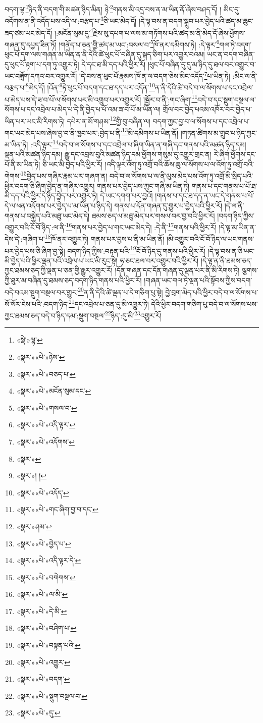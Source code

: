 བདག་ལྟ་\footnote{«སྡེ་»ལྷ་}ཉིད་ནི་བདག་གི་མཚན་ཉིད་མིན། ཉེ་\footnote{«སྣར་»«པེ་»ཉེས་}གནས་མི་འདྲ་བས་ན་མ་ཡིན་ནོ་ཞེས་བཤད་དོ། །
མིང་དུ་འདོགས་ན་ནི་འདོད་པས་འདི་ལ་:བརྩད་པ་\footnote{«སྣར་»«པེ་»བཅད་པ་}ཅི་ཡང་མེད་དོ། །དེ་ལྟ་བས་ན་བདག་སྒྲུབ་པར་བྱེད་པའི་ཚད་མ་ཆུང་ཟད་ཙམ་ཡང་མེད་དོ། །:མངོན་སུམ་དུ་\footnote{«སྣར་»«པེ་»མངོན་སུམ་དང་}རྗེས་སུ་དཔག་པ་ལས་མ་གཏོགས་པའི་ཚད་མ་ནི་མེད་དོ་ཞེས་ཕྱོགས་གཞན་དུ་དཔྱད་ཟིན་ཏོ། །གནོད་པ་ཅན་གྱི་ཚད་མ་ཡང་:བསལ་བ་\footnote{«སྣར་»«པེ་»གསལ་བ་}ཁོ་ནར་དམིགས་ཏེ། :དེ་ལྟར་\footnote{«སྣར་»«པེ་»འདི་ལྟར་}གལ་ཏེ་བདག་ཕུང་པོ་དག་ལས་གཞན་མ་ཡིན་ན་ནི་དེའི་ཚེ་ཕུང་པོ་བཞིན་དུ་སྐད་ཅིག་པར་འགྱུར་བའམ། ཡང་ན་བདག་བཞིན་དུ་ཕུང་པོ་རྟག་པ་དག་ཏུ་འགྱུར་ཏེ། དེ་དང་ཐ་མི་དད་པའི་ཕྱིར་རོ། །ཕུང་པོ་བཞིན་དུ་དུ་མ་ཉིད་དུ་ཐལ་བར་འགྱུར་བ་ཡང་བཟློག་དཀའ་བར་འགྱུར་རོ། །དེ་བས་ན་ཕུང་པོ་རྣམས་ཁོ་ན་ལ་བདག་ཅེས་མིང་འདོད་\footnote{«སྣར་»«པེ་»འདོགས་}པ་ཡིན་ཏེ། :མིང་ལ་ནི་བརྩད་པ་\footnote{«སྣར་»}མེད་དོ། །འོན་\footnote{«སྣར་»། །}ཏེ་ཕུང་པོ་བདག་དང་ཐ་དད་པར་འདོན་\footnote{«སྣར་»«པེ་»འདོད་}ན་ནི་དེའི་ཚེ་བདེ་བ་ལ་སོགས་པ་དང་འབྲེལ་པ་མེད་པས་དེ་ཟ་བ་པོ་ལ་སོགས་པར་མི་འགྲུབ་པར་འགྱུར་རོ། །སྦྱོར་བ་ནི་:གང་ཞིག་\footnote{«སྣར་»«པེ་»གང་ཞིག་བྱ་བ་དང་}བདེ་བ་དང་སྡུག་བསྔལ་ལ་སོགས་པ་དང་འབྲེལ་པ་མེད་པ་དེ་ནི་བྱེད་པ་པོ་འམ་ཟ་བ་པོ་མ་ཡིན་ལ། གྲོལ་བར་བྱེད་པའམ་འཁོར་བར་བྱེད་པ་ཡིན་པར་ཡང་མི་རིགས་ཏེ། དཔེར་ན་མོ་གཤམ་\footnote{«སྣར་»ཤམ་}གྱི་བུ་བཞིན་ལ། བདག་ཀྱང་བྱ་བ་ལ་སོགས་པ་དང་འབྲེལ་པ་གང་ཡང་མེད་པས་ཞེས་བྱ་བ་ནི་ཁྱབ་པར་:བྱེད་པ་ནི་\footnote{«སྣར་»«པེ་»བྱེད་པ་}མི་དམིགས་པ་ཡིན་ནོ། །གཏན་ཚིགས་མ་གྲུབ་པ་ཉིད་ཀྱང་མ་ཡིན་ཏེ། :འདི་ལྟར་\footnote{«སྣར་»«པེ་»འདི་ལྟར་དེ་}བདེ་བ་ལ་སོགས་པ་དང་འབྲེལ་པ་ཞིག་ཡིན་ན་གཞི་དང་གནས་པའི་མཚན་ཉིད་དམ། ལྡན་པའི་མཚན་ཉིད་དམ། རྒྱུ་དང་འབྲས་བུའི་མཚན་ཉིད་དམ་ཕྱོགས་གསུམ་དུ་འགྱུར་གྲང་ན། རེ་ཞིག་ཕྱོགས་དང་པོ་ནི་མ་ཡིན་ཏེ། ཅི་ཡང་མི་བྱེད་པའི་ཕྱིར་རོ། །འདི་ལྟར་འོག་ཏུ་འགྲོ་བའི་ཆོས་ཆུ་ལ་སོགས་པ་ལ་འོག་ཏུ་འགྲོ་བའི་གེགས་\footnote{«སྣར་»«པེ་»བགེགས་}བྱེད་པས་གཞིར་རྣམ་པར་གཞག་ན། བདེ་བ་ལ་སོགས་པ་ལ་ནི་ལུས་མེད་པས་འོག་ཏུ་འགྲོ་མི་སྲིད་པའི་ཕྱིར་བདག་ཅི་ཞིག་བྱེད་ན་གཞིར་འགྱུར། གནས་པར་བྱེད་པས་ཀྱང་གཞི་མ་ཡིན་ཏེ། གནས་པ་དང་གནས་པ་པོ་ཐ་མི་དད་པའི་ཕྱིར་དེ་ཉིད་བྱེད་པར་འགྱུར་ཏེ། དེ་ཡང་དགག་པར་བྱའོ། །གནས་པ་དང་ཐ་དད་ན་ཡང་དེ་གནས་པ་པོ་དེ་ལ་ཕན་འདོགས་པར་བྱེད་པ་མ་ཡིན་པ་ཉིད་དེ། གནས་པ་དོན་གཞན་དུ་གྱུར་པ་བྱེད་པའི་ཕྱིར་རོ། །དེ་ལ་ནི་གནས་པ་བསྐྱེད་པའི་མཐུ་ཡང་མེད་དེ། ཐམས་ཅད་ལ་མཐུ་མེད་པར་གསལ་བར་བྱ་བའི་ཕྱིར་རོ། །བདག་ཉིད་ཀྱིས་འགྱུར་བའི་ངོ་བོ་ཉིད་:ལ་ནི་\footnote{«སྣར་»«པེ་»ལ་མི་}གནས་པར་བྱེད་པ་གང་ཡང་མེད་དེ། :དེ་ནི་\footnote{«སྣར་»«པེ་»དེ་མི་}གནས་པའི་ཕྱིར་རོ། །དེ་ལྟ་མ་ཡིན་ན་དེས་དེ་:གཞིག་པ་\footnote{«སྣར་»«པེ་»བཤིག་པ་}ཁོ་ནར་འགྱུར་ཏེ། གནས་པར་བྱས་པ་ནི་མ་ཡིན་ནོ། །མི་འགྱུར་བའི་ངོ་བོ་ཉིད་ལ་ཡང་གནས་པར་བྱེད་པས་ཅི་ཞིག་བྱ་སྟེ། བདག་ཉིད་ཀྱིས་:བརྟན་པའི་\footnote{«སྣར་»«པེ་»བསྟན་པའི་}ངོ་བོ་ཉིད་དུ་གནས་པའི་ཕྱིར་རོ། །དེ་ལྟ་བས་ན་ཅི་ཡང་མི་བྱེད་པའི་ཕྱིར་ལྡན་པའི་འབྲེལ་པ་ཡང་མི་རུང་སྟེ། ཧ་ཅང་ཐལ་བར་འགྱུར་བའི་ཕྱིར་རོ། །དེ་ལྟ་ན་ནི་ཐམས་ཅད་ཀྱང་ཐམས་ཅད་ཀྱི་ལྡན་པ་ཅན་གྱི་རྒྱུར་འགྱུར་རོ། །དོན་གཞན་དང་དོན་གཞན་དུ་ལྡན་པར་ནི་མི་རིགས་ཏེ། ལྕགས་ཀྱི་ཐུར་མ་བཞིན་དུ་ཐམས་ཅད་བདག་ཉིད་གནས་པའི་ཕྱིར་རོ། །གཞན་ཡང་གལ་ཏེ་ལྡན་པའི་སྟོབས་ཀྱིས་བདག་བདེ་བའམ་སྡུག་བསྔལ་བར་གྱུར་\footnote{«སྣར་»«པེ་»འགྱུར་}ན་ནི་དེའི་ཚེ་ལྡན་པ་དེ་གཅིག་པུ་སྟེ། བྱེ་བྲག་མེད་པའི་ཕྱིར་བདེ་བ་ལ་སོགས་པ་སོ་སོར་ངེས་པའི་:བདག་ཉིད་\footnote{«སྣར་»«པེ་»བདག་}དང་འབྲེལ་པ་ཅན་དུ་མི་འགྱུར་ཏེ། དེའི་ཕྱིར་བདག་གཅིག་པུ་བདེ་བ་ལ་སོགས་པས་ཀྱང་ཐམས་ཅད་བདེ་བ་ཉིད་དམ་:སྡུག་བསྔལ་\footnote{«སྣར་»«པེ་»སྡུག་བསྔལ་བ་}ཉིད་:དུ་མི་\footnote{«སྣར་»«པེ་»དུ་}འགྱུར་རོ། 